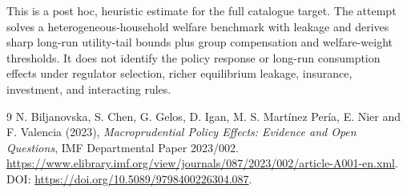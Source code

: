 \documentclass[11pt]{article}
\theoremstyle{remark}\newtheorem{remark}[theorem]{Remark}
\begin{document}
This is a post hoc, heuristic estimate for the full catalogue target.
The attempt solves a heterogeneous-household welfare benchmark with leakage and derives sharp long-run utility-tail bounds plus group compensation and welfare-weight thresholds. It does not identify the policy response or long-run consumption effects under regulator selection, richer equilibrium leakage, insurance, investment, and interacting rules.

\begin{thebibliography}{9}
 N. Biljanovska, S. Chen, G. Gelos, D. Igan, M. S. Mart\'inez Per\'ia, E. Nier and F. Valencia (2023), \emph{Macroprudential Policy Effects: Evidence and Open Questions}, IMF Departmental Paper 2023/002. \url{https://www.elibrary.imf.org/view/journals/087/2023/002/article-A001-en.xml}. DOI: \url{https://doi.org/10.5089/9798400226304.087}.
\end{thebibliography}
\end{document}

